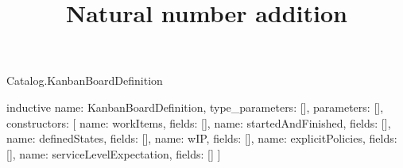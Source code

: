 \begin{lexlean}{Catalog.KanbanBoardDefinition}
\title{Natural number addition}
\begin{semanticmodule}
inductive{
  name: KanbanBoardDefinition,
  type_parameters: [],
  parameters: [],
  constructors: [
    {name: workItems, fields: []},
    {name: startedAndFinished, fields: []},
    {name: definedStates, fields: []},
    {name: wIP, fields: []},
    {name: explicitPolicies, fields: []},
    {name: serviceLevelExpectation, fields: []}
  ]
}
\end{semanticmodule}
\end{lexlean}
